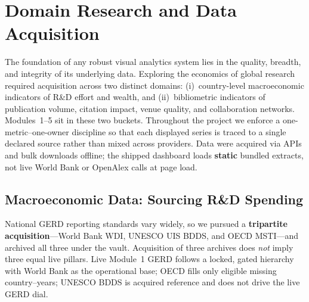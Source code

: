 \section{Domain Research and Data Acquisition}
The foundation of any robust visual analytics system lies in the quality, breadth, and integrity of its underlying data. Exploring the economics of global research required acquisition across two distinct domains: (i)~country-level macroeconomic indicators of R\&D effort and wealth, and (ii)~bibliometric indicators of publication volume, citation impact, venue quality, and collaboration networks. Modules~1--5 sit in these two buckets. Throughout the project we enforce a one-metric--one-owner discipline so that each displayed series is traced to a single declared source rather than mixed across providers. Data were acquired via APIs and bulk downloads offline; the shipped dashboard loads \textbf{static} bundled extracts, not live World Bank or OpenAlex calls at page load.

\subsection{Macroeconomic Data: Sourcing R\&D Spending}
National GERD reporting standards vary widely, so we pursued a \textbf{tripartite acquisition}---World Bank WDI, UNESCO UIS BDDS, and OECD MSTI---and archived all three under the vault. Acquisition of three archives does \emph{not} imply three equal live pillars. Live Module~1 GERD follows a locked, gated hierarchy with World Bank as the operational base; OECD fills only eligible missing country--years; UNESCO BDDS is acquired reference and does not drive the live GERD dial.

